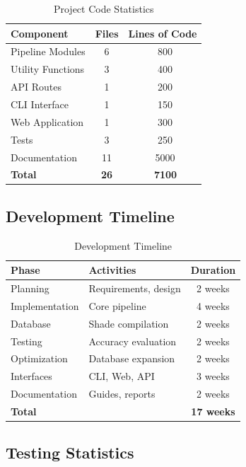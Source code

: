 \begin{table}[h]
\centering
\begin{tabular}{|l|c|c|}
\hline
\textbf{Component} & \textbf{Files} & \textbf{Lines of Code} \\
\hline
Pipeline Modules & 6 & ~800 \\
Utility Functions & 3 & ~400 \\
API Routes & 1 & ~200 \\
CLI Interface & 1 & ~150 \\
Web Application & 1 & ~300 \\
Tests & 3 & ~250 \\
Documentation & 11 & ~5000 \\
\hline
\textbf{Total} & \textbf{26} & \textbf{~7100} \\
\hline
\end{tabular}
\caption{Project Code Statistics}
\end{table}

\subsection{Development Timeline}

\begin{table}[h]
\centering
\begin{tabular}{|l|l|c|}
\hline
\textbf{Phase} & \textbf{Activities} & \textbf{Duration} \\
\hline
Planning & Requirements, design & 2 weeks \\
Implementation & Core pipeline & 4 weeks \\
Database & Shade compilation & 2 weeks \\
Testing & Accuracy evaluation & 2 weeks \\
Optimization & Database expansion & 2 weeks \\
Interfaces & CLI, Web, API & 3 weeks \\
Documentation & Guides, reports & 2 weeks \\
\hline
\textbf{Total} & & \textbf{17 weeks} \\
\hline
\end{tabular}
\caption{Development Timeline}
\end{table}

\subsection{Testing Statistics}

